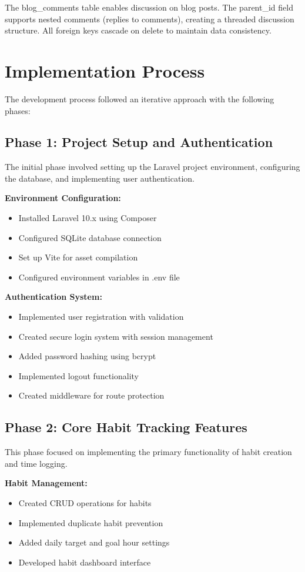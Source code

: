 \documentclass[12pt,a4paper]{report}
\newcommand{\JustifiedNormal}{\fontsize{12}{14}\selectfont\justifying\setlength{\parindent}{0pt}}
\begin{document}
\JustifiedNormal
The blog\_comments table enables discussion on blog posts. The parent\_id field supports nested comments (replies to comments), creating a threaded discussion structure. All foreign keys cascade on delete to maintain data consistency.

\section{Implementation Process}
\JustifiedNormal
The development process followed an iterative approach with the following phases:

\subsection{Phase 1: Project Setup and Authentication}
\JustifiedNormal
The initial phase involved setting up the Laravel project environment, configuring the database, and implementing user authentication.

\textbf{Environment Configuration:}
\begin{itemize}
  \item Installed Laravel 10.x using Composer
  \item Configured SQLite database connection
  \item Set up Vite for asset compilation
  \item Configured environment variables in .env file
\end{itemize}

\textbf{Authentication System:}
\begin{itemize}
  \item Implemented user registration with validation
  \item Created secure login system with session management
  \item Added password hashing using bcrypt
  \item Implemented logout functionality
  \item Created middleware for route protection
\end{itemize}

\subsection{Phase 2: Core Habit Tracking Features}
\JustifiedNormal
This phase focused on implementing the primary functionality of habit creation and time logging.

\textbf{Habit Management:}
\begin{itemize}
  \item Created CRUD operations for habits
  \item Implemented duplicate habit prevention
  \item Added daily target and goal hour settings
  \item Developed habit dashboard interface
\end{itemize}
\end{document}
